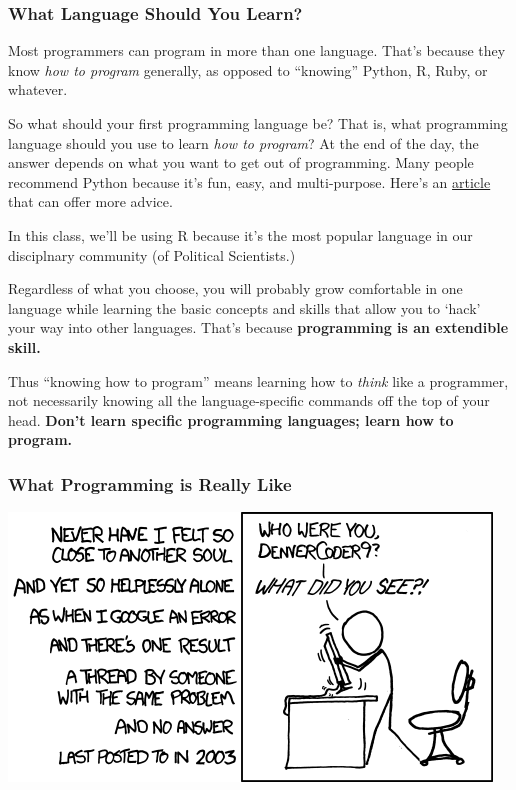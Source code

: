 \documentclass[]{book}
\begin{document}
\subsubsection*{What Language Should You
Learn?}\label{what-language-should-you-learn}

Most programmers can program in more than one language. That's because
they know \emph{how to program} generally, as opposed to ``knowing''
Python, R, Ruby, or whatever.

So what should your first programming language be? That is, what
programming language should you use to learn \emph{how to program}? At
the end of the day, the answer depends on what you want to get out of
programming. Many people recommend Python because it's fun, easy, and
multi-purpose. Here's an
\href{http://lifehacker.com/which-programming-language-should-i-learn-first-1477153665}{article}
that can offer more advice.

In this class, we'll be using R because it's the most popular language
in our disciplnary community (of Political Scientists.)

Regardless of what you choose, you will probably grow comfortable in one
language while learning the basic concepts and skills that allow you to
`hack' your way into other languages. That's because \textbf{programming
is an extendible skill.}

Thus ``knowing how to program'' means learning how to \emph{think} like
a programmer, not necessarily knowing all the language-specific commands
off the top of your head. \textbf{Don't learn specific programming
languages; learn how to program.}

\subsubsection*{What Programming is Really
Like}\label{what-programming-is-really-like}

\begin{center}\includegraphics[width=0.7\linewidth]{img/xkcd} \end{center}
\end{document}
